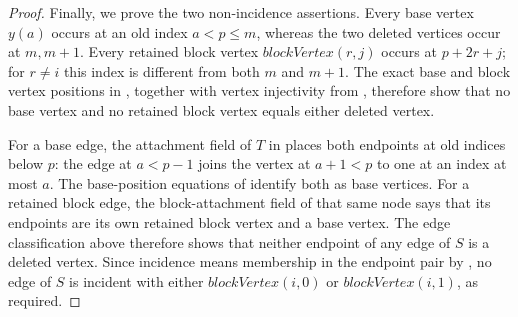 \begin{proof}
Finally, we prove the two non-incidence assertions.  Every base vertex
$y(a)$ occurs at an old index $a<p\leq m$, whereas the two deleted
vertices occur at $m,m+1$.  Every retained block vertex
$\mathit{blockVertex}(r,j)$ occurs at $p+2r+j$; for $r\ne i$ this index
is different from both $m$ and $m+1$.  The exact base and block vertex
positions in , together with
vertex injectivity from , therefore show that no
base vertex and no retained block vertex equals either deleted vertex.

For a base edge, the attachment field of $T$ in
 places both endpoints at old indices below $p$:
the edge at $a<p-1$ joins the vertex at $a+1<p$ to one at an index at
most $a$.  The base-position equations of
 identify both as base vertices.
For a retained block edge, the block-attachment field of that same node
says that its endpoints are its own retained block vertex and a base
vertex.  The edge classification above therefore shows that neither
endpoint of any edge of $S$ is a deleted vertex.  Since incidence means
membership in the endpoint pair by , no edge of $S$
is incident with either $\mathit{blockVertex}(i,0)$ or
$\mathit{blockVertex}(i,1)$, as required.
\end{proof}
